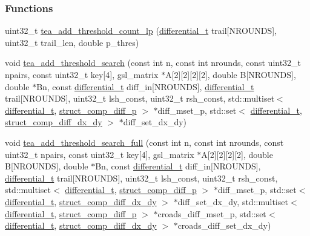 \subsubsection*{\-Functions}
\begin{DoxyCompactItemize}
\item 
uint32\-\_\-t \hyperlink{tea-add-threshold-search_8cc_a50a3716bc83febae5e18ba2934aea8ab}{tea\-\_\-add\-\_\-threshold\-\_\-count\-\_\-lp} (\hyperlink{structdifferential__t}{differential\-\_\-t} trail\mbox{[}\-N\-R\-O\-U\-N\-D\-S\mbox{]}, uint32\-\_\-t trail\-\_\-len, double p\-\_\-thres)
\item 
void \hyperlink{tea-add-threshold-search_8cc_ab59db616cde68bf9245c7d24c98e3a6c}{tea\-\_\-add\-\_\-threshold\-\_\-search} (const int n, const int nrounds, const uint32\-\_\-t npairs, const uint32\-\_\-t key\mbox{[}4\mbox{]}, gsl\-\_\-matrix $\ast$\-A\mbox{[}2\mbox{]}\mbox{[}2\mbox{]}\mbox{[}2\mbox{]}\mbox{[}2\mbox{]}, double \-B\mbox{[}\-N\-R\-O\-U\-N\-D\-S\mbox{]}, double $\ast$\-Bn, const \hyperlink{structdifferential__t}{differential\-\_\-t} diff\-\_\-in\mbox{[}\-N\-R\-O\-U\-N\-D\-S\mbox{]}, \hyperlink{structdifferential__t}{differential\-\_\-t} trail\mbox{[}\-N\-R\-O\-U\-N\-D\-S\mbox{]}, uint32\-\_\-t lsh\-\_\-const, uint32\-\_\-t rsh\-\_\-const, std\-::multiset$<$ \hyperlink{structdifferential__t}{differential\-\_\-t}, \hyperlink{structstruct__comp__diff__p}{struct\-\_\-comp\-\_\-diff\-\_\-p} $>$ $\ast$diff\-\_\-mset\-\_\-p, std\-::set$<$ \hyperlink{structdifferential__t}{differential\-\_\-t}, \hyperlink{structstruct__comp__diff__dx__dy}{struct\-\_\-comp\-\_\-diff\-\_\-dx\-\_\-dy} $>$ $\ast$diff\-\_\-set\-\_\-dx\-\_\-dy)
\item 
void \hyperlink{tea-add-threshold-search_8cc_a760f25356b1203a35c8ece3f4e8a038c}{tea\-\_\-add\-\_\-threshold\-\_\-search\-\_\-full} (const int n, const int nrounds, const uint32\-\_\-t npairs, const uint32\-\_\-t key\mbox{[}4\mbox{]}, gsl\-\_\-matrix $\ast$\-A\mbox{[}2\mbox{]}\mbox{[}2\mbox{]}\mbox{[}2\mbox{]}\mbox{[}2\mbox{]}, double \-B\mbox{[}\-N\-R\-O\-U\-N\-D\-S\mbox{]}, double $\ast$\-Bn, const \hyperlink{structdifferential__t}{differential\-\_\-t} diff\-\_\-in\mbox{[}\-N\-R\-O\-U\-N\-D\-S\mbox{]}, \hyperlink{structdifferential__t}{differential\-\_\-t} trail\mbox{[}\-N\-R\-O\-U\-N\-D\-S\mbox{]}, uint32\-\_\-t lsh\-\_\-const, uint32\-\_\-t rsh\-\_\-const, std\-::multiset$<$ \hyperlink{structdifferential__t}{differential\-\_\-t}, \hyperlink{structstruct__comp__diff__p}{struct\-\_\-comp\-\_\-diff\-\_\-p} $>$ $\ast$diff\-\_\-mset\-\_\-p, std\-::set$<$ \hyperlink{structdifferential__t}{differential\-\_\-t}, \hyperlink{structstruct__comp__diff__dx__dy}{struct\-\_\-comp\-\_\-diff\-\_\-dx\-\_\-dy} $>$ $\ast$diff\-\_\-set\-\_\-dx\-\_\-dy, std\-::multiset$<$ \hyperlink{structdifferential__t}{differential\-\_\-t}, \hyperlink{structstruct__comp__diff__p}{struct\-\_\-comp\-\_\-diff\-\_\-p} $>$ $\ast$croads\-\_\-diff\-\_\-mset\-\_\-p, std\-::set$<$ \hyperlink{structdifferential__t}{differential\-\_\-t}, \hyperlink{structstruct__comp__diff__dx__dy}{struct\-\_\-comp\-\_\-diff\-\_\-dx\-\_\-dy} $>$ $\ast$croads\-\_\-diff\-\_\-set\-\_\-dx\-\_\-dy)

\end{DoxyCompactItemize}
